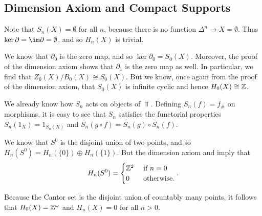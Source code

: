 \documentclass[../../solutions.tex]{subfiles}
\begin{document}
\subsection{Dimension Axiom and Compact Supports}
\begin{exercise} \leavevmode
Note that $S_n(X)=\emptyset$ for all $n$, because there is no function $\Delta^n\to X=\emptyset$. 
Thus $\ker\partial=\im\partial=\emptyset$, and so $H_n(X)$ is trivial.
\end{exercise}

\begin{exercise} \leavevmode
We know that $\partial_0$ is the zero map, and so $\ker\partial_0=S_0(X)$. 
Moreover, the proof of the dimension axiom shows that $\partial_1$ is the zero map as well. 
In particular, we find that $Z_0(X)/B_0(X)\cong S_0(X)$. 
But we know, once again from the proof of the dimension axiom, that $S_0(X)$ is infinite cyclic and hence $H_0(X)\cong\mathbb{Z}$. 
\end{exercise}

\begin{exercise} \leavevmode
We already know how $S_n$ acts on objects of $\Top$. 
Defining $S_n(f)=f_\#$ on morphisms, it is easy to see that $S_n$ satisfies the functorial properties $S_n(1_X)=1_{S_n(X)}$ and $S_n(g\circ f)=S_n(g)\circ S_n(f)$. 
\end{exercise}

\begin{exercise} \leavevmode
We know that $S^0$ is the disjoint union of two points, and so $H_n(S^0)=H_n(\{0\})\oplus H_n(\{1\})$. 
But the dimension axiom and  imply that \[H_n(S^0)=\begin{cases}\mathbb{Z}^2&~\text{if}~n=0\\0&~\text{otherwise}.\end{cases}.\]
\end{exercise}

\begin{exercise} \leavevmode
Because the Cantor set is the disjoint union of countably many points, it follows that $H_0(X)=\mathbb{Z}^\omega$ and $H_n(X)=0$ for all $n>0$. 
\end{exercise}
\end{document}
